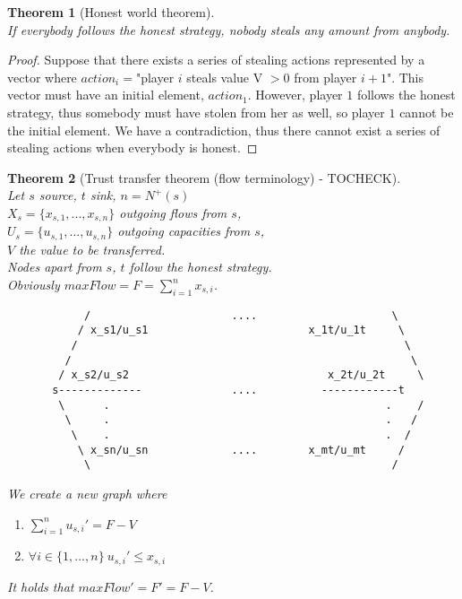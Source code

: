 \documentclass[11pt]{article}
\newtheorem{theorem}{Theorem}[section]
\theoremstyle{definition}
\theoremstyle{corollary}
\begin{document}
    \begin{theorem}[Honest world theorem] \ \\
    \label{honestworld}
       If everybody follows the honest strategy, nobody steals any amount from anybody.
    \end{theorem}
    \begin{proof}
       Suppose that there exists a series of stealing actions represented by a vector where $action_i = $"player $i$ steals
       value V $>0$ from player $i+1$". This vector must have an initial element, $action_1$. However, player $1$ follows
       the honest strategy, thus somebody must have stolen from her as well, so player $1$ cannot be the initial element.
       We have a contradiction, thus there cannot exist a series of stealing actions when everybody is honest.
    \end{proof}
    \begin{theorem}[Trust transfer theorem (flow terminology) - TOCHECK] \ \\
    \label{trusttransfer}
       Let $s$ source, $t$ sink, $n = N^{+}(s)$ \\
       $X_s = \{x_{s, 1}, ..., x_{s, n}\}$ outgoing flows from $s$, \\
       $U_s = \{u_{s, 1}, ..., u_{s, n}\}$ outgoing capacities from $s$, \\
       $V$ the value to be transferred. \\
       Nodes apart from $s$, $t$ follow the honest strategy. \\
       Obviously $maxFlow = F = \sum\limits_{i=1}^{n}{x_{s, i}}$.
       {\em \begin{lstlisting}
            /                      ....                     \
           / x_s1/u_s1                         x_1t/u_1t     \
          /                                                   \
         /                                                     \
        / x_s2/u_s2                               x_2t/u_2t     \
       s-------------              ....          ------------t
        \      .                                           .    /
         \     .                                           .   /
          \    .                                           .  /
           \ x_sn/u_sn             ....        x_mt/u_mt     /
            \                                               /
       \end{lstlisting}}
       We create a new graph where
       \begin{enumerate}
         \item  $\sum\limits_{i=1}^{n}{u_{s, i}'} = F - V$
         \item $\forall i \in \{1,...,n\} \: u_{s, i}' \leq x_{s, i}$
       \end{enumerate}
 
       It holds that $maxFlow' = F' = F - V$.
    \end{theorem}
\end{document}
